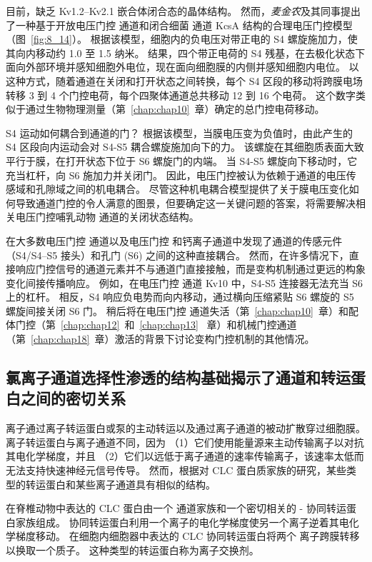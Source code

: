 目前，缺乏 Kv1.2–Kv2.1 嵌合体闭合态的晶体结构。 然而，\textit{麦金农}及其同事提出了一种基于开放电压门控  通道和闭合细菌  通道 KcsA 结构的合理电压门控模型（图~\ref{fig:8_14}）。
根据该模型，细胞内的负电压对带正电的 S4 螺旋施加力，使其向内移动约 1.0 至 1.5 纳米。
结果，四个带正电荷的 S4 残基，在去极化状态下面向外部环境并感知细胞外电位，现在面向细胞膜的内侧并感知细胞内电位。
以这种方式，随着通道在关闭和打开状态之间转换，每个 S4 区段的移动将跨膜电场转移 3 到 4 个门控电荷，每个四聚体通道总共移动 12 到 16 个电荷。 
这个数字类似于通过生物物理测量（第~\ref{chap:chap10}~章）确定的总门控电荷移动。


S4 运动如何耦合到通道的门？
根据该模型，当膜电压变为负值时，由此产生的 S4 区段向内运动会对 S4-S5 耦合螺旋施加向下的力。
该螺旋在其细胞质表面大致平行于膜，在打开状态下位于 S6 螺旋门的内端。
当 S4-S5 螺旋向下移动时，它充当杠杆，向 S6 施加力并关闭门。
因此，电压门控被认为依赖于通道的电压传感域和孔隙域之间的机电耦合。
尽管这种机电耦合模型提供了关于膜电压变化如何导致通道门控的令人满意的图景，但要确定这一关键问题的答案，将需要解决相关电压门控哺乳动物  通道的关闭状态结构。


在大多数电压门控  通道以及电压门控  和钙离子通道中发现了通道的传感元件（S4/S4–S5 接头）和孔门 (S6) 之间的这种直接耦合。
然而，在许多情况下，直接响应门控信号的通道元素并不与通道门直接接触，而是变构机制通过更远的构象变化间接传播响应。
例如，在电压门控  通道 Kv10 中，S4-S5 连接器无法充当 S6 上的杠杆。
相反，S4 响应负电势而向内移动，通过横向压缩紧贴 S6 螺旋的 S5 螺旋间接关闭 S6 门。
稍后将在电压门控  通道失活（第~\ref{chap:chap10}~章）和配体门控（第~\ref{chap:chap12}~和~\ref{chap:chap13}~ 章）和机械门控通道（第~\ref{chap:chap18}~章）激活的背景下讨论变构门控机制的其他情况。



\subsection{氯离子通道选择性渗透的结构基础揭示了通道和转运蛋白之间的密切关系}

离子通过离子转运蛋白或泵的主动转运以及通过离子通道的被动扩散穿过细胞膜。
离子转运蛋白与离子通道不同，因为
（1）它们使用能量源来主动传输离子以对抗其电化学梯度，并且
（2）它们以远低于离子通道的速率传输离子，该速率太低而无法支持快速神经元信号传导。
然而，根据对 CLC 蛋白质家族的研究，某些类型的转运蛋白和某些离子通道具有相似的结构。


在脊椎动物中表达的 CLC 蛋白由一个  通道家族和一个密切相关的 - 协同转运蛋白家族组成。
协同转运蛋白利用一个离子的电化学梯度使另一个离子逆着其电化学梯度移动。
在细胞内细胞器中表达的 CLC  协同转运蛋白将两个  离子跨膜转移以换取一个质子。
这种类型的转运蛋白称为离子交换剂。


